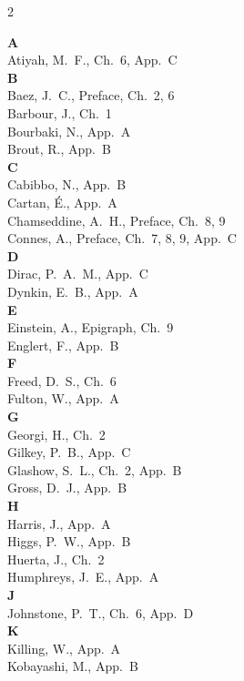 \documentclass[11pt,a4paper,openright]{book}
\theoremstyle{plain}
\theoremstyle{definition}
\begin{document}
\begin{multicols}{2}
\small

\textbf{A}\\
Atiyah, M.~F., Ch.~6, App.~C\\[2pt]

\textbf{B}\\
Baez, J.~C., Preface, Ch.~2, 6\\
Barbour, J., Ch.~1\\
Bourbaki, N., App.~A\\
Brout, R., App.~B\\[2pt]

\textbf{C}\\
Cabibbo, N., App.~B\\
Cartan, É., App.~A\\
Chamseddine, A.~H., Preface, Ch.~8, 9\\
Connes, A., Preface, Ch.~7, 8, 9, App.~C\\[2pt]

\textbf{D}\\
Dirac, P.~A.~M., App.~C\\
Dynkin, E.~B., App.~A\\[2pt]

\textbf{E}\\
Einstein, A., Epigraph, Ch.~9\\
Englert, F., App.~B\\[2pt]

\textbf{F}\\
Freed, D.~S., Ch.~6\\
Fulton, W., App.~A\\[2pt]

\textbf{G}\\
Georgi, H., Ch.~2\\
Gilkey, P.~B., App.~C\\
Glashow, S.~L., Ch.~2, App.~B\\
Gross, D.~J., App.~B\\[2pt]

\textbf{H}\\
Harris, J., App.~A\\
Higgs, P.~W., App.~B\\
Huerta, J., Ch.~2\\
Humphreys, J.~E., App.~A\\[2pt]

\textbf{J}\\
Johnstone, P.~T., Ch.~6, App.~D\\[2pt]

\textbf{K}\\
Killing, W., App.~A\\
Kobayashi, M., App.~B\\[2pt]


\end{multicols}
\end{document}
